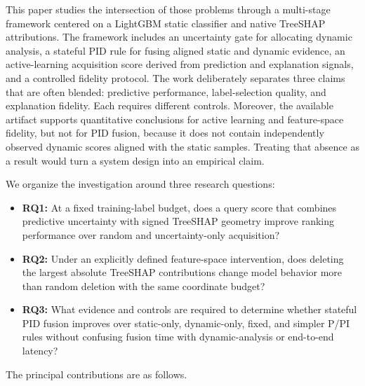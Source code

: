 This paper studies the intersection of those problems through a multi-stage
framework centered on a LightGBM static classifier and native TreeSHAP
attributions. The framework includes an uncertainty gate for allocating dynamic
analysis, a stateful PID rule for fusing aligned static and dynamic evidence, an
active-learning acquisition score derived from prediction and explanation
signals, and a controlled fidelity protocol. The work deliberately separates
three claims that are often blended: predictive performance, label-selection
quality, and explanation fidelity. Each requires different controls. Moreover,
the available artifact supports quantitative conclusions for active learning and
feature-space fidelity, but not for PID fusion, because it does not contain
independently observed dynamic scores aligned with the static samples. Treating
that absence as a result would turn a system design into an empirical claim.

We organize the investigation around three research questions:

\begin{itemize}
    \item \textbf{RQ1:} At a fixed training-label budget, does a query score that
    combines predictive uncertainty with signed TreeSHAP geometry improve ranking
    performance over random and uncertainty-only acquisition?
    \item \textbf{RQ2:} Under an explicitly defined feature-space intervention,
    does deleting the largest absolute TreeSHAP contributions change model
    behavior more than random deletion with the same coordinate budget?
    \item \textbf{RQ3:} What evidence and controls are required to determine
    whether stateful PID fusion improves over static-only, dynamic-only, fixed,
    and simpler P/PI rules without confusing fusion time with dynamic-analysis or
    end-to-end latency?
\end{itemize}

The principal contributions are as follows.

